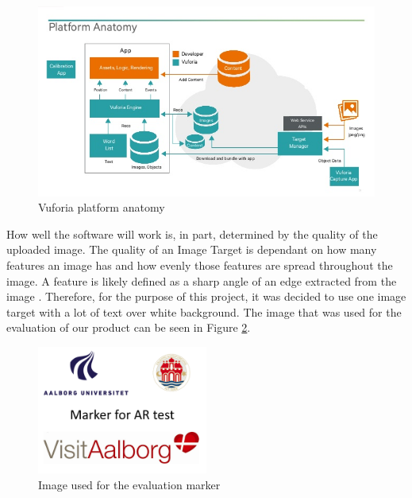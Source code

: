 \begin{figure}[h!]
    \centering
    \includegraphics[width=\textwidth]{figures/imp1.jpg}
    \caption{Vuforia platform anatomy \cite{getting_started}}\label{fig:imp1}
\end{figure}

How well the software will  work is, in part, determined by the quality of the uploaded image. The quality of an Image Target is dependant on how many features an image has and how evenly those features are spread throughout the image. A feature is likely defined as a sharp angle of an edge extracted from the image \cite{Natural_features}. Therefore, for the purpose of this project, it was decided to use one image target with a lot of text over white background. The image that was used for the evaluation of our product can be seen in Figure \ref{fig:imp2}. 

\begin{figure}[h!]
    \centering
    \includegraphics[width=0.5\textwidth]{figures/imp2.png}
    \caption{Image used for the evaluation marker}\label{fig:imp2}
\end{figure}

